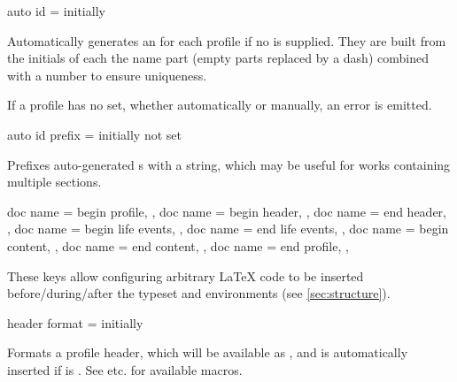 \documentclass[
	a4paper,
]{article}
\begin{document}
\begin{docKey}
	{auto id}
	{=}
	{initially }

	Automatically generates an  for each profile if no  is supplied. They are built from the initials of each the name part (empty parts replaced by a dash) combined with a number to ensure uniqueness.

	If a profile has no  set, whether automatically or manually, an error is emitted.
\end{docKey}

\begin{docKey}
	{auto id prefix}
	{=}
	{initially not set}

	Prefixes auto-generated s with a string, which may be useful for works containing multiple sections.
\end{docKey}

\begin{docKeys}
	[
		doc parameter = {=\meta{...}},
		doc description = {initially not set},
	]
	{
		{
			doc name = begin profile,
		},
		{
			doc name = begin header,
		},
		{
			doc name = end header,
		},
		{
			doc name = begin life events,
		},
		{
			doc name = end life events,
		},
		{
			doc name = begin content,
		},
		{
			doc name = end content,
		},
		{
			doc name = end profile,
		},
	}

	These keys allow configuring arbitrary \LaTeX{} code to be inserted before/during/after the typeset  and  environments (see \cref{sec:structure}).

\end{docKeys}

\begin{docKey}
	{header format}
	{=}
	{initially }

	Formats a profile header, which will be available as , and is automatically inserted if  is . See  etc. for available macros.
\end{docKey}
\end{document}
